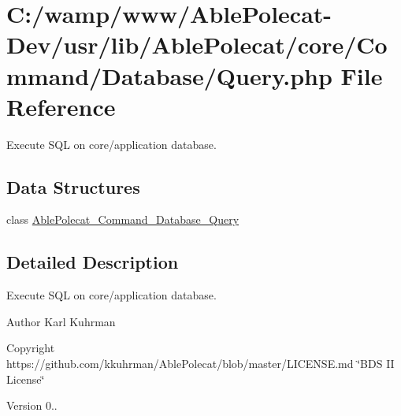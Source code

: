 \hypertarget{_query_8php}{}\section{C\+:/wamp/www/\+Able\+Polecat-\/\+Dev/usr/lib/\+Able\+Polecat/core/\+Command/\+Database/\+Query.php File Reference}
\label{_query_8php}


Execute S\+Q\+L on core/application database.  


\subsection*{Data Structures}
\begin{DoxyCompactItemize}
\item 
class \hyperlink{class_able_polecat___command___database___query}{Able\+Polecat\+\_\+\+Command\+\_\+\+Database\+\_\+\+Query}
\end{DoxyCompactItemize}


\subsection{Detailed Description}
Execute S\+Q\+L on core/application database. 

\begin{DoxyAuthor}{Author}
Karl Kuhrman 
\end{DoxyAuthor}
\begin{DoxyCopyright}{Copyright}
https\+://github.com/kkuhrman/\+Able\+Polecat/blob/master/\+L\+I\+C\+E\+N\+S\+E.\+md \char`\"{}\+B\+D\+S I\+I License\char`\"{} 
\end{DoxyCopyright}
\begin{DoxyVersion}{Version}
0.. 
\end{DoxyVersion}
